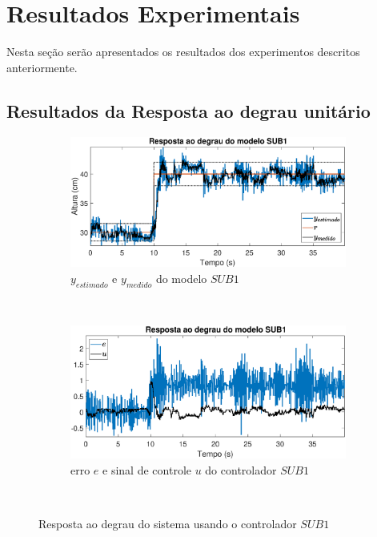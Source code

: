 \section{Resultados Experimentais}
Nesta seção serão apresentados os resultados dos experimentos descritos anteriormente.
\subsection{Resultados da Resposta ao degrau unitário}\label{rstep}

\begin{figure}[H]
	\centering
	\begin{subfigure}[b]{1\textwidth}
		\includegraphics[width=1\linewidth]{steprsub1y}
		\caption[$y_{estimado}$ e $y_{medido}$ do modelo $SUB1$]{$y_{estimado}$ e $y_{medido}$ do modelo $SUB1$}
		\label{fig:steprsub1y}
	\end{subfigure}
	~ %
	\begin{subfigure}[b]{1\textwidth}
		\includegraphics[width=1\linewidth]{steprsub1e}
		\caption[erro $e$ e sinal de controle $u$ do controlador $SUB1$]{erro $e$ e sinal de controle $u$ do controlador $SUB1$}
		\label{fig:steprsub1e}
	\end{subfigure}
	~ %
	
	\caption{Resposta ao degrau do sistema usando o controlador $SUB1$}\label{fig:steprsub1}
\end{figure}

